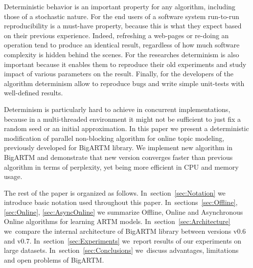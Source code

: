 \documentclass[russian,english]{llncs}
\begin{document}
Deterministic behavior is an important property for any algorithm,
including those of a stochastic nature.
For the end users of a software system run-to-run reproducibility is a must-have property,
because this is what they expect based on their previous experience.
Indeed, refreshing a web-pages or re-doing an operation tend to
produce an identical result, regardless of how much software complexity is hidden behind the scenes.
For the researches determinism is also important
because it enables them to reproduce their old experiments
and study impact of various parameters on the result.
Finally, for the developers of the algorithm
determinism allow to reproduce bugs and write simple unit-tests with well-defined results.

Determinism is particularly hard to achieve
in concurrent implementations, because in a multi-threaded environment
it might not be sufficient to just fix a random seed or an initial approximation.
In this paper we present a deterministic modification of parallel non-blocking algorithm
for online topic modeling, previously developed for BigARTM library.
We implement new algorithm in BigARTM and demonstrate that new version converges faster
than previous algorithm in terms of perplexity,
yet being more efficient in CPU and memory usage.

The rest of the paper is organized as follows.
In~section~\ref{sec:Notation}
we introduce basic notation used throughout this paper.
In~sections~\ref{sec:Offline}, \ref{sec:Online}, \ref{sec:AsyncOnline}
we summarize Offline, Online and Asynchronous Online algorithms for learning ARTM models.
In~section~\ref{sec:Architecture}
we~compare the internal architecture of BigARTM library between versions v0.6 and v0.7.
In~section~\ref{sec:Experiments}
we~report results of our experiments on large datasets.
In~section~\ref{sec:Conclusions}
we~discuss advantages, limitations and open problems of BigARTM.

\end{document}

